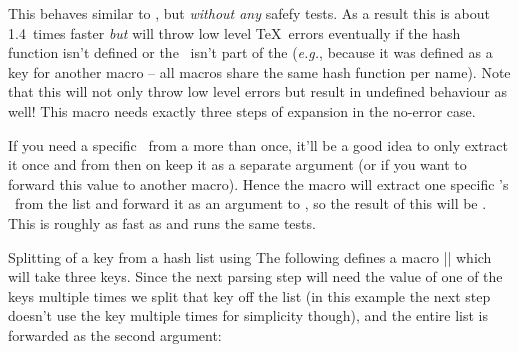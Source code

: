 \begin{function}{\ekvcValueFast}
  \begin{syntax}
  \end{syntax}
  This behaves similar to , but \emph{without any} safefy tests.
  As a result this is about 1.4~times faster \emph{but} will throw low level
  \TeX\ errors eventually if the hash function isn't defined or the \key\ isn't
  part of the  (\emph{e.g.}, because it was defined as a key for
  another macro -- all macros share the same hash function per  name).
  Note that this will not only throw low level errors but result in undefined
  behaviour as well! This macro needs exactly three steps of expansion in the
  no-error case.
\end{function}

\begin{function}{\ekvcValueSplit}
  \begin{syntax}
  \end{syntax}
  If you need a specific \key\ from a  more than once, it'll be a
  good idea to only extract it once and from then on keep it as a separate
  argument (or if you want to forward this value to another macro). Hence the
  macro  will extract one specific \key's \val\ from the list
  and forward it as an argument to , so the result of this will be
  . This is roughly as fast as  and runs
  the same tests.
\end{function}
\begin{example}
    {Splitting of a key from a hash list using }
  The following defines a macro |\foo| which will take three keys. Since the
  next parsing step will need the value of one of the keys multiple times we
  split that key off the list (in this example the next step doesn't use the key
  multiple times for simplicity though), and the entire list is forwarded as the
  second argument:
  \begin{enverb}
    \ekvcHash{}
      {}
    \newcommand*\foobar[2]{a is #1.\par
                           b is \ekvcValue{b}{#2}.\par
                           c is \ekvcValue{c}{#2}.\par}
    \foo{}
  \end{enverb}
\end{example}

